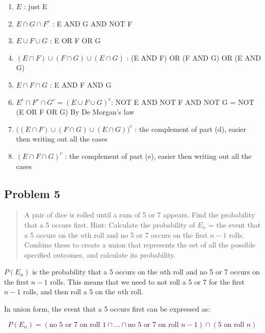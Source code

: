 \documentclass[10pt]{article}
\begin{document}
\begin{enumerate}[label=(\alph*)]
	\item $\boxed{E}$ : just E
	\item $\boxed{E \cap G \cap F^c}$ : E AND G AND NOT F
	\item $\boxed{E \cup F \cup G}$ : E OR F OR G
	\item $\boxed{(E \cap F) \cup (F \cap G) \cup (E \cap G)}$ : (E AND F) OR (F AND G) OR (E AND G)
	\item $\boxed{E \cap F \cap G}$ : E AND F AND G
	\item $\boxed{E^c \cap F^c \cap G^c = (E \cup F \cup G)^c}$: NOT E AND NOT F AND NOT G = NOT (E OR F OR G) By De Morgan's law
	\item $\boxed{\big((E \cap F) \cup (F \cap G) \cup (E \cap G)\big)^c}$ : the complement of part (d), easier then writing out all the cases
	\item $\boxed{(E \cap F \cap G)^c}$ : the complement of part (e), easier then writing out all the cases
\end{enumerate}

\subsection*{Problem 5}
\begin{quote}
	A pair of dice is rolled until a sum of 5 or 7 appears. Find the probability that a 5 occurs first. Hint: Calculate the probability of $E_n$ = the event that a 5 occurs on the $n$th roll and no 5 or 7 occurs on the first $n-1$ rolls. Combine these to create a union that represents the set of all the possible specified outcomes, and calculate its probability.
\end{quote}

\divider

$P(E_n)$ is the probability that a 5 occurs on the $n$th roll and no 5 or 7 occurs on the first $n-1$ rolls. This means that we need to not roll a 5 or 7 for the first $n-1$ rolls, and then roll a 5 on the $n$th roll.


In union form, the event that a 5 occurs first can be expressed as:

\[P(E_n) = (\text{no 5 or 7 on roll } 1 \cap \ldots \cap \text{no 5 or 7 on roll } n-1) \cap (\text{5 on roll } n) \]
\end{document}
